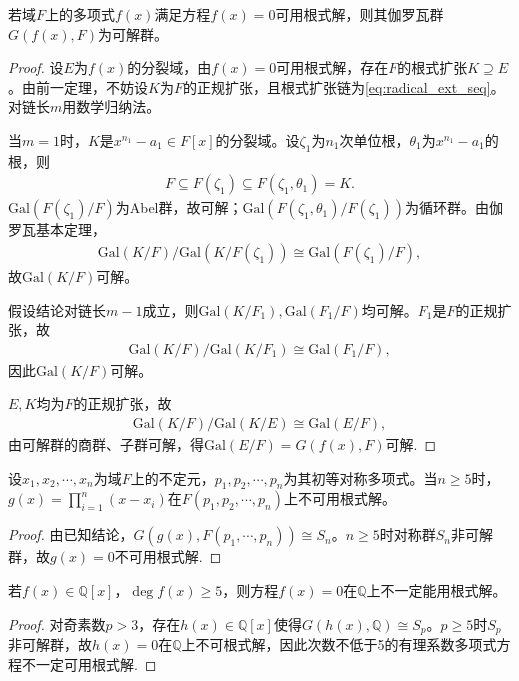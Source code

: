 \documentclass[../../main.tex]{subfiles}%
\begin{document}
\begin{theorem}
若域$F$上的多项式$f(x)$满足方程$f(x)=0$可用根式解，则其伽罗瓦群$G(f(x),F)$为可解群。
\end{theorem}
\begin{proof}

设$E$为$f(x)$的分裂域，由$f(x)=0$可用根式解，存在$F$的根式扩张$K\supseteq E$。由前一定理，不妨设$K$为$F$的正规扩张，且根式扩张链为\eqref{eq:radical_ext_seq}。对链长$m$用数学归纳法。

当$m=1$时，$K$是$x^{n_1}-a_1\in F[x]$的分裂域。设$\zeta_1$为$n_1$次单位根，$\theta_1$为$x^{n_1}-a_1$的根，则
\begin{align*}
F\subseteq F(\zeta_1)\subseteq F(\zeta_1,\theta_1)=K.
\end{align*}
$\mathrm{Gal}(F(\zeta_1)/F)$为Abel群，故可解；$\mathrm{Gal}(F(\zeta_1,\theta_1)/F(\zeta_1))$为循环群。由伽罗瓦基本定理，
\begin{align*}
\mathrm{Gal}(K/F)/\mathrm{Gal}(K/F(\zeta_1))\cong\mathrm{Gal}(F(\zeta_1)/F),
\end{align*}
故$\mathrm{Gal}(K/F)$可解。

假设结论对链长$m-1$成立，则$\mathrm{Gal}(K/F_1),\mathrm{Gal}(F_1/F)$均可解。$F_1$是$F$的正规扩张，故
\begin{align*}
\mathrm{Gal}(K/F)/\mathrm{Gal}(K/F_1)\cong\mathrm{Gal}(F_1/F),
\end{align*}
因此$\mathrm{Gal}(K/F)$可解。

$E,K$均为$F$的正规扩张，故
\begin{align*}
\mathrm{Gal}(K/F)/\mathrm{Gal}(K/E)\cong\mathrm{Gal}(E/F),
\end{align*}
由可解群的商群、子群可解，得$\mathrm{Gal}(E/F)=G(f(x),F)$可解.

\end{proof}

\begin{corollary}
设$x_1,x_2,\cdots,x_n$为域$F$上的不定元，$p_1,p_2,\cdots,p_n$为其初等对称多项式。当$n\geqslant5$时，$g(x)=\prod\limits_{i=1}^n(x-x_i)$在$F(p_1,p_2,\cdots,p_n)$上不可用根式解。
\end{corollary}
\begin{proof}

由已知结论，$G(g(x),F(p_1,\cdots,p_n))\cong S_n$。$n\geqslant5$时对称群$S_n$非可解群，故$g(x)=0$不可用根式解.

\end{proof}

\begin{corollary}
若$f(x)\in\mathbb{Q}[x]$，$\deg f(x)\geqslant5$，则方程$f(x)=0$在$\mathbb{Q}$上不一定能用根式解。
\end{corollary}
\begin{proof}

对奇素数$p>3$，存在$h(x)\in\mathbb{Q}[x]$使得$G(h(x),\mathbb{Q})\cong S_p$。$p\geqslant5$时$S_p$非可解群，故$h(x)=0$在$\mathbb{Q}$上不可根式解，因此次数不低于5的有理系数多项式方程不一定可用根式解.

\end{proof}
\end{document}
